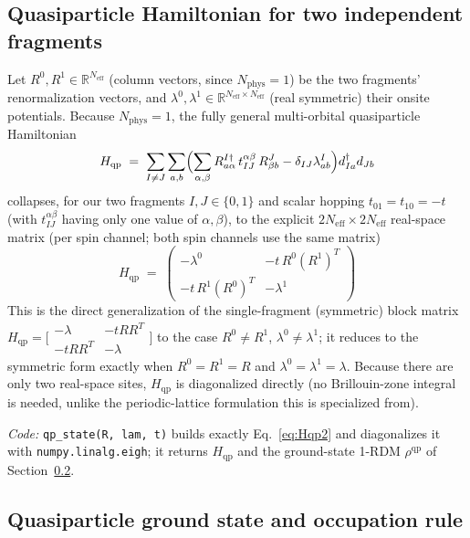 \documentclass[11pt]{article}
\newcommand{\Neff}{N_{\mathrm{eff}}}
\newcommand{\Nphys}{N_{\mathrm{phys}}}
\newcommand{\Hqp}{H_{\mathrm{qp}}}
\begin{document}
\subsection{Quasiparticle Hamiltonian for two independent fragments}

Let $R^0,R^1\in\mathbb R^{\Neff}$ (column vectors, since $\Nphys=1$) be the two
fragments' renormalization vectors, and $\lambda^0,\lambda^1\in\mathbb
R^{\Neff\times\Neff}$ (real symmetric) their onsite potentials. Because
$\Nphys=1$, the fully general multi-orbital quasiparticle Hamiltonian
\begin{equation}
  \Hqp \;=\; \sum_{I\neq J}\sum_{a,b}\Bigl(\sum_{\alpha,\beta}
     R^{I\dagger}_{a\alpha}\,t^{\alpha\beta}_{IJ}\,R^{J}_{\beta b}
     - \delta_{IJ}\lambda^{I}_{ab}\Bigr) d^{\dagger}_{Ia}d_{Jb}
\end{equation}
collapses, for our two fragments $I,J\in\{0,1\}$ and scalar hopping
$t_{01}=t_{10}=-t$ (with $t^{\alpha\beta}_{IJ}$ having only one value of
$\alpha,\beta$), to the explicit $2\Neff\times2\Neff$ real-space matrix (per
spin channel; both spin channels use the same matrix)
\begin{equation}
  \boxed{\;
  \Hqp \;=\;
  \begin{pmatrix}
    -\lambda^{0} & -t\,R^{0}(R^{1})^{T} \\[2pt]
    -t\,R^{1}(R^{0})^{T} & -\lambda^{1}
  \end{pmatrix}
  \;}
  \label{eq:Hqp2}
\end{equation}
This is the direct generalization of the single-fragment (symmetric) block
matrix $\Hqp=\bigl[\begin{smallmatrix}-\lambda & -tRR^T\\ -tRR^T & -\lambda\end{smallmatrix}\bigr]$
to the case $R^0\neq R^1$, $\lambda^0\neq\lambda^1$; it reduces to the
symmetric form exactly when $R^0=R^1=R$ and $\lambda^0=\lambda^1=\lambda$.
Because there are only two real-space sites, $\Hqp$ is diagonalized directly
(no Brillouin-zone integral is needed, unlike the periodic-lattice
formulation this is specialized from).

\emph{Code:} \texttt{qp\_state(R, lam, t)} builds exactly
Eq.~\eqref{eq:Hqp2} and diagonalizes it with \texttt{numpy.linalg.eigh};
it returns $\Hqp$ and the ground-state 1-RDM $\rho^{\mathrm{qp}}$ of
Section~\ref{sec:filling}.

\subsection{Quasiparticle ground state and occupation rule}
\label{sec:filling}
\end{document}
